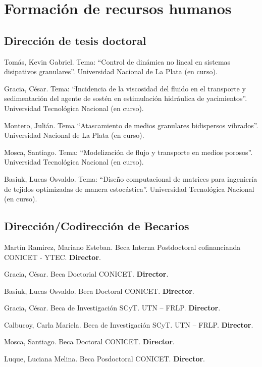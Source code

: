 \section{Formación de recursos humanos}

\subsection{Dirección de tesis doctoral}

 Tomás, Kevin Gabriel. Tema: ``Control de dinámica no lineal en sistemas disipativos granulares''. Universidad Nacional de La Plata (en curso).

 Gracia, César. Tema: ``Incidencia de la viscosidad del fluido en el transporte y sedimentación del agente de sostén en estimulación hidráulica de yacimientos''. Universidad Tecnológica Nacional (en curso).

 Montero, Julián. Tema ``Atascamiento de medios granulares bidispersos vibrados''. Universidad Nacional de La Plata (en curso).

 Mosca, Santiago. Tema: ``Modelización de flujo y transporte en medios porosos''. Universidad Tecnológica Nacional (en curso).

 Basiuk, Lucas Osvaldo. Tema: ``Diseño computacional de matrices para ingeniería de tejidos optimizadas de manera estocástica''. Universidad Tecnológica Nacional  (en curso).

\subsection{Dirección/Codirección de Becarios}
     Martín Ramirez, Mariano Esteban. Beca Interna Postdoctoral cofinancianda CONICET - YTEC. \textbf{Director}.

     Gracia, César. Beca Doctorial CONICET. \textbf{Director}.

     Basiuk, Lucas Osvaldo. Beca Doctoral CONICET. \textbf{Director}.

     Gracia, César. Beca de Investigación SCyT. UTN -- FRLP. \textbf{Director}.

     Calbucoy, Carla Mariela. Beca de Investigación SCyT. UTN -- FRLP. \textbf{Director}.

     Mosca, Santiago. Beca Doctoral CONICET. \textbf{Director}.

     Luque, Luciana Melina. Beca Posdoctoral CONICET. \textbf{Director}. 

